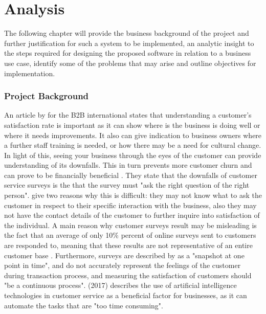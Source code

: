 \chapter{Analysis }

The following chapter will provide the business background of the project and further justification for such a system to be implemented, an analytic insight to the steps required for designing the proposed software in relation to a business use case, identify some of the problems that may arise and outline objectives for implementation.

\subsection*{Project Background}
An article by \citeauthor{hague} for the B2B international states that understanding a customer's satisfaction rate is important as it can show where is the business is doing well or where it needs improvements. It also can give indication to business owners where a further staff training is needed, or how there may be a need for cultural change. In light of this, seeing your business through the eyes of the customer can provide understanding of its downfalls. This in turn prevents more customer churn and can prove to be financially beneficial \citep{hague}. They state that the downfalls of customer service surveys is the that the survey must "ask the right question of the right person". \citeauthor{hague} give two reasons why this is difficult: they may not know what to ask the customer in respect to their specific interaction with the business, also they may not have the contact details of the customer to further inquire into satisfaction of the individual. A main reason why customer surveys result may be misleading is the fact that an average of only 10\% percent of online surveys sent to customers are responded to, meaning that these results are not representative of an entire customer base \citep{willott} . Furthermore, surveys are described by \citeauthor{hague} as a "snapshot at one point in time", and do not accurately represent the feelings of the customer during transaction process, and measuring the satisfaction of customers should "be a continuous process". \citeauthor{keith} (2017) describes the use of artificial intelligence technologies in customer service as a beneficial factor for businesses, as it can automate the tasks that are "too time consuming".

